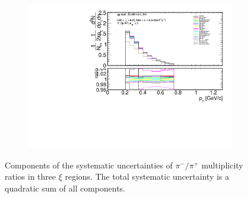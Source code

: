 \begin{figure}[h!]
\begin{subfigure}{.49\textwidth}
		\includegraphics[width=\textwidth,page=21]{chapters/chrgSTAR/img/syst/outPID_SDT.pdf}
	\end{subfigure}
	\begin{minipage}{.49\textwidth}
		\caption[Components of the systematic uncertainties of $\pi^-/\pi^+$ multiplicity ratios  in three $\xi$ regions]{Components of the systematic uncertainties of $\pi^-/\pi^+$ multiplicity ratios  in three $\xi$ regions. The total  systematic uncertainty is a quadratic sum of all  components.}
		\label{fig:results_star_syst_pi}
	\end{minipage}
\end{figure}

